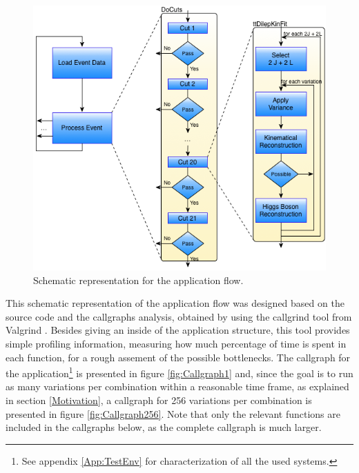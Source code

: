 \begin{figure}[!htp]
	\begin{center}
		\includegraphics[scale=0.6]{../../common/img/graf_abstract_flow_with_kinfit.png}
		\caption{Schematic representation for the \tth application flow.}
		\label{fig:SchematicFlow1}
	\end{center}
\end{figure}

This schematic representation of the application flow was designed based on the source code and the callgraphs analysis, obtained by using the callgrind tool from Valgrind \cite{Valgrind}. Besides giving an inside of the application structure, this tool provides simple profiling information, measuring how much percentage of time is spent in each function, for a rough assement of the possible bottlenecks. The callgraph for the application\footnote{See appendix \ref{App:TestEnv} for characterization of all the used systems.} is presented in figure \ref{fig:Callgraph1} and, since the goal is to run as many variations per combination within a reasonable time frame, as explained in section \ref{Motivation}, a callgraph for 256 variations per combination is presented in figure \ref{fig:Callgraph256}. Note that only the relevant functions are included in the callgraphs below, as the complete callgraph is much larger.

